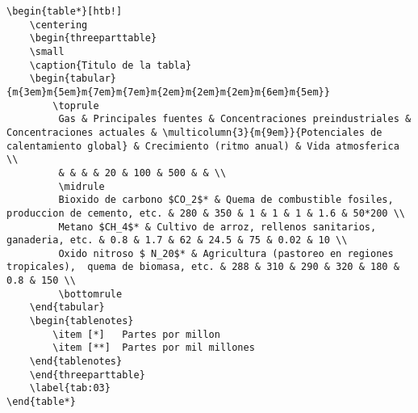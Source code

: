 \documentclass[12pt]{difu100cia} %
\begin{document}
\begin{lstlisting}
\begin{table*}[htb!]
    \centering
    \begin{threeparttable}
    \small
    \caption{Titulo de la tabla}
    \begin{tabular}{m{3em}m{5em}m{7em}m{7em}m{2em}m{2em}m{2em}m{6em}m{5em}}
        \toprule
         Gas & Principales fuentes & Concentraciones preindustriales & Concentraciones actuales & \multicolumn{3}{m{9em}}{Potenciales de calentamiento global} & Crecimiento (ritmo anual) & Vida atmosferica \\
         & & & & 20 & 100 & 500 & & \\
         \midrule
         Bioxido de carbono $CO_2$* & Quema de combustible fosiles, produccion de cemento, etc. & 280 & 350 & 1 & 1 & 1 & 1.6 & 50*200 \\
         Metano $CH_4$* & Cultivo de arroz, rellenos sanitarios, ganaderia, etc. & 0.8 & 1.7 & 62 & 24.5 & 75 & 0.02 & 10 \\
         Oxido nitroso $ N_20$* & Agricultura (pastoreo en regiones tropicales),  quema de biomasa, etc. & 288 & 310 & 290 & 320 & 180 & 0.8 & 150 \\
         \bottomrule
    \end{tabular}
    \begin{tablenotes}
        \item [*]	Partes por millon
        \item [**]	Partes por mil millones
    \end{tablenotes}
    \end{threeparttable}
    \label{tab:03}
\end{table*}
\end{lstlisting}
\end{document}
